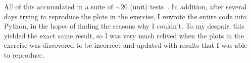 \documentclass[11pt,twocolumn]{article}
\begin{document}
All of this accumulated in a suite of $\sim 20$ (unit)
tests~\cite[tests/]{github}. In addition, after several days trying to
reproduce the plots in the exercise, I rewrote the entire code into
Python, in the hopes of finding the reasons why I couldn't. To my
despair, this yielded the exact same result, so I was very much
relived when the plots in the exercise was discovered to be incorrect and updated
with results that I was able to reproduce. 


\printbibliography
\end{document}

